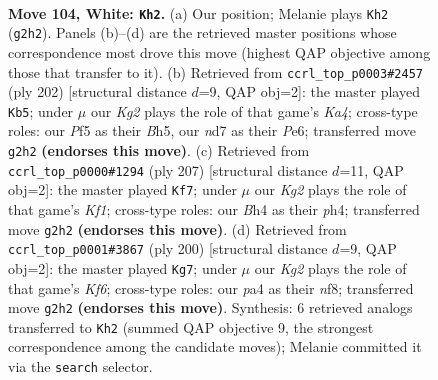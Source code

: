 \documentclass[11pt]{article}
\begin{document}
\clearpage

\begin{figure}[p]\centering
\begin{subfigure}{0.46\textwidth}\centering
\resizebox{\linewidth}{!}{%
\newchessgame
\chessboard[
  setfen={6k1/3n4/8/5P2/p6B/P6P/6K1/8 w - - 27 104},
  showmover=false,
  pgfstyle=straightmove, color=movearrow, markmove={g2-h2}
]}
\caption{}
\end{subfigure}\hfill
\begin{subfigure}{0.46\textwidth}\centering
\resizebox{\linewidth}{!}{%
\newchessgame
\chessboard[
  setfen={3k4/8/3pP3/3P3B/KP6/8/5b2/8 w - - 13 102},
  showmover=false,
  pgfstyle=straightmove, color=movearrow, markmove={a4-b5}
]}
\caption{}
\end{subfigure}
\\[4pt]
\begin{subfigure}{0.46\textwidth}\centering
\resizebox{\linewidth}{!}{%
\newchessgame
\chessboard[
  setfen={5k2/6p1/8/3K4/1p5P/8/1P6/8 b - - 4 104},
  showmover=false,
  pgfstyle=straightmove, color=movearrow, markmove={f8-f7}
]}
\caption{}
\end{subfigure}\hfill
\begin{subfigure}{0.46\textwidth}\centering
\resizebox{\linewidth}{!}{%
\newchessgame
\chessboard[
  setfen={2k2n2/5P2/2P2K2/8/8/1N6/p7/8 w - - 17 101},
  showmover=false,
  pgfstyle=straightmove, color=movearrow, markmove={f6-g7}
]}
\caption{}
\end{subfigure}
\caption{\textbf{Move 104, White: \texttt{Kh2}.} (a) Our position; Melanie plays \texttt{Kh2} (\texttt{g2h2}). Panels (b)--(d) are the retrieved master positions whose correspondence most drove this move (highest QAP objective among those that transfer to it). (b) Retrieved from \texttt{ccrl\_top\_p0003\#2457} (ply 202) [structural distance $d$=9, QAP obj=2]: the master played \texttt{Kb5}; under $\mu$ our \emph{Kg2} plays the role of that game's \emph{Ka4}; cross-type roles: our \emph{P}f5 as their \emph{B}h5, our \emph{n}d7 as their \emph{P}e6; transferred move \texttt{g2h2} \textbf{(endorses this move)}. (c) Retrieved from \texttt{ccrl\_top\_p0000\#1294} (ply 207) [structural distance $d$=11, QAP obj=2]: the master played \texttt{Kf7}; under $\mu$ our \emph{Kg2} plays the role of that game's \emph{Kf1}; cross-type roles: our \emph{B}h4 as their \emph{p}h4; transferred move \texttt{g2h2} \textbf{(endorses this move)}. (d) Retrieved from \texttt{ccrl\_top\_p0001\#3867} (ply 200) [structural distance $d$=9, QAP obj=2]: the master played \texttt{Kg7}; under $\mu$ our \emph{Kg2} plays the role of that game's \emph{Kf6}; cross-type roles: our \emph{p}a4 as their \emph{n}f8; transferred move \texttt{g2h2} \textbf{(endorses this move)}. Synthesis: 6 retrieved analogs transferred to \texttt{Kh2} (summed QAP objective 9, the strongest correspondence among the candidate moves); Melanie committed it via the \texttt{search} selector.}
\label{fig:thought-m206}
\end{figure}
\end{document}
